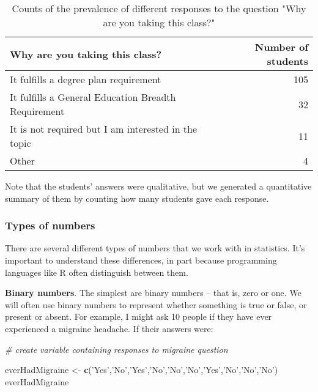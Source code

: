 \documentclass[]{book}
\newenvironment{Shaded}{\begin{snugshade}}{\end{snugshade}}
\newcommand{\KeywordTok}[1]{\textcolor[rgb]{0.13,0.29,0.53}{\textbf{#1}}}
\newcommand{\StringTok}[1]{\textcolor[rgb]{0.31,0.60,0.02}{#1}}
\newcommand{\CommentTok}[1]{\textcolor[rgb]{0.56,0.35,0.01}{\textit{#1}}}
\newcommand{\NormalTok}[1]{#1}
\theoremstyle{definition}
\theoremstyle{definition}
\theoremstyle{definition}
\theoremstyle{remark}
\begin{document}
\begin{table}

\caption{\label{tab:WhyTakingClass}Counts of the prevalence of different responses to the question "Why are you taking this class?"}
\centering
\begin{tabular}[t]{lr}
\toprule
Why are you taking this class? & Number of students\\
\midrule
It fulfills a degree plan requirement & 105\\
It fulfills a General Education Breadth Requirement & 32\\
It is not required but I am interested in the topic & 11\\
Other & 4\\
\bottomrule
\end{tabular}
\end{table}

Note that the students' answers were qualitative, but we generated a
quantitative summary of them by counting how many students gave each
response.

\subsubsection{Types of numbers}\label{types-of-numbers}

There are several different types of numbers that we work with in
statistics. It's important to understand these differences, in part
because programming languages like R often distinguish between them.

\textbf{Binary numbers}. The simplest are binary numbers -- that is,
zero or one. We will often use binary numbers to represent whether
something is true or false, or present or absent. For example, I might
ask 10 people if they have ever experienced a migraine headache. If
their answers were:

\begin{Shaded}
\begin{Highlighting}[]
\CommentTok{# create variable containing responses to migraine question}

\NormalTok{everHadMigraine <-}\StringTok{ }\KeywordTok{c}\NormalTok{(}\StringTok{'Yes'}\NormalTok{,}\StringTok{'No'}\NormalTok{,}\StringTok{'Yes'}\NormalTok{,}\StringTok{'No'}\NormalTok{,}\StringTok{'No'}\NormalTok{,}\StringTok{'No'}\NormalTok{,}\StringTok{'Yes'}\NormalTok{,}\StringTok{'No'}\NormalTok{,}\StringTok{'No'}\NormalTok{,}\StringTok{'No'}\NormalTok{)}
\NormalTok{everHadMigraine}
\end{Highlighting}
\end{Shaded}
\end{document}

